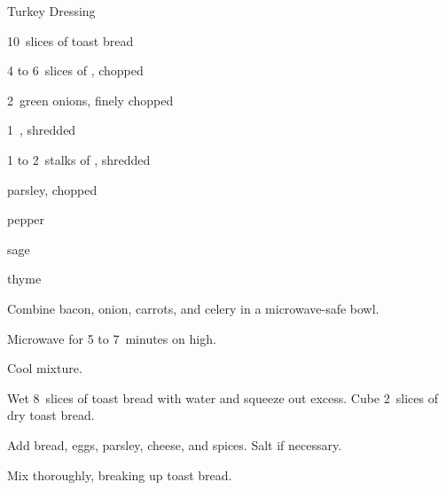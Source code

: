 \begin{recipe}{Turkey Dressing}{}{}

\begin{ingredients}
\item 10~slices of toast bread
\item 4 to 6~slices of , chopped
\item 2~green onions, finely chopped
\item 1~, shredded
\item 1 to 2~stalks of , shredded
\item \C{\quarter} parsley, chopped
\item \C{\quarter} 
\item pepper
\item sage
\item thyme
\end{ingredients}

\begin{directions}
\item Combine bacon, onion, carrots, and celery in a microwave-safe bowl.
\item Microwave for 5 to 7~minutes on high.
\item Cool mixture.
\item Wet 8~slices of toast bread with water and squeeze out excess. Cube 2~slices of dry toast bread.
\item Add bread, eggs, parsley, cheese, and spices. Salt if necessary.
\item Mix thoroughly, breaking up toast bread.
\end{directions}

\end{recipe}
